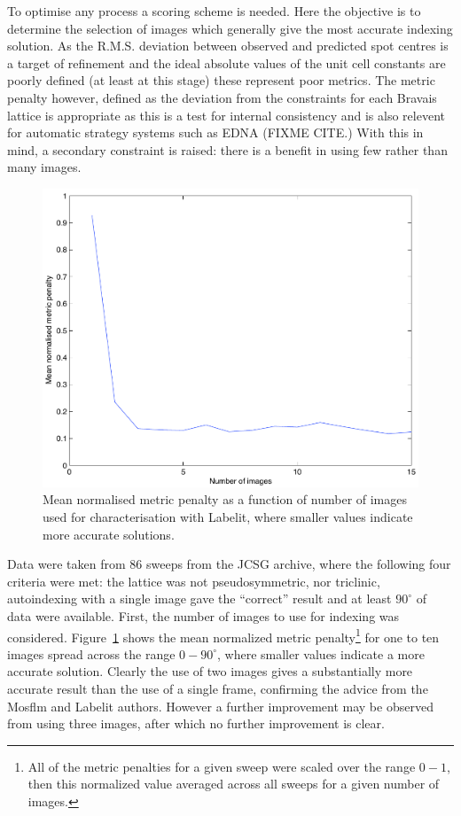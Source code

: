 \documentclass[preprint,pdf]{iucr}
\begin{document}
To optimise any process a scoring scheme is needed. Here the objective
is to determine the selection of images which generally give the most
accurate indexing solution. As the R.M.S. deviation between observed
and predicted spot centres is a target of refinement and the ideal absolute
values of the unit cell constants are poorly defined (at least at this
stage) these represent poor metrics. The metric penalty however,
defined as the deviation from the constraints for each Bravais lattice
\cite{Grosse-Kunstleve:sh5006} is appropriate as this is a test for
internal consistency 
and is also relevent for automatic strategy systems such as EDNA
(FIXME CITE.) With this in mind, a secondary constraint is raised:
there is a benefit in using few rather than many images.

\begin{figure}
\caption{Mean normalised metric penalty as a function of number of
  images used for characterisation with Labelit, where smaller values
  indicate more accurate solutions.
\label{figure:no_images}}
\centering
\includegraphics[scale=0.5]{figures/no_images.pdf}
\end{figure}

Data were taken from 86 sweeps from the JCSG archive, where  the
following four
criteria were met: the lattice was not pseudosymmetric, nor triclinic,
autoindexing with a single image gave the ``correct'' result and at
least $90^{\circ}$ of data were available. First, the number of images
to use for indexing was considered. Figure~\ref{figure:no_images}
shows the mean 
normalized metric penalty\footnote{All of the metric penalties for a
  given sweep were scaled over the range $0 - 1$, then this normalized
  value averaged across all sweeps for a given number of images.} for
one to ten images spread across the range $0 - 90^{\circ}$, where
smaller values indicate a more accurate solution. Clearly the use of
two images gives a substantially more accurate result than the use of
a single frame, confirming the advice from the Mosflm and
Labelit authors. However a further improvement may be observed from
using three images, after which no further improvement is clear. 
\end{document}
